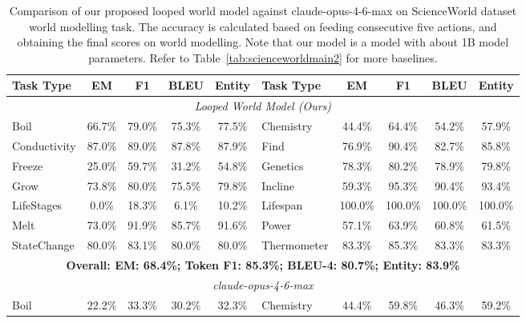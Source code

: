 \begin{table}[h]
\centering
    \setlength\tabcolsep{2.5pt}
    \setlength\extrarowheight{0pt}
\caption{Comparison of our proposed looped world model against claude-opus-4-6-max \citep{anthropic2026opus46} on ScienceWorld dataset \citep{wang-etal-2022-scienceworld} world modelling task. The accuracy is calculated based on feeding consecutive five actions, and obtaining the final scores on world modelling. Note that our model is a model with about 1B model parameters. Refer to Table~\ref{tab:scienceworldmain2} for more baselines.}
\label{tab:scienceworldmain}
\begin{tabular}{lcccc|lcccc}
\toprule
\textbf{Task Type} & \textbf{EM} & \textbf{F1}
  & \textbf{BLEU} & \textbf{Entity} & \textbf{Task Type} & \textbf{EM} & \textbf{F1}
  & \textbf{BLEU} & \textbf{Entity} \\
\midrule
\multicolumn{10}{c}{\textit{Looped World Model (Ours)}}\\
\midrule
Boil  & 66.7\%    &  79.0\%   & 75.3\%    &  77.5\% &
Chemistry        &    44.4\%    &   64.4\% &   54.2\%   &   57.9\%\\
Conductivity       &    87.0\%    &  89.0\%  &  87.8\%    &  87.9\% &
Find               &    76.9\%    &   90.4\%    &82.7\%      &85.8\%\\
Freeze              &    25.0\%    &  59.7\%  &  31.2\%      &54.8\%&
Genetics          &    78.3\%   &   80.2\%   & 78.9\%    &  79.8\%\\
Grow               &    73.8\%   &   80.0\%  &  75.5\%  &    79.8\%&
Incline           &    59.3\%   &   95.3\%  &  90.4\%  &    93.4\%\\
LifeStages          &     0.0\%    &  18.3\%   &  6.1\%      &10.2\%&
Lifespan            &   100.0\%   &  100.0\%  & 100.0\%   &  100.0\%\\
Melt               &    73.0\%    &  91.9\%  &  85.7\%   &   91.6\%&
Power               &    57.1\%   &   63.9\% &   60.8\%    &  61.5\%\\
StateChange         &    80.0\%    &  83.1\%  &  80.0\%   &   80.0\%&
Thermometer         &    83.3\%   &   85.3\%  &  83.3\%    &  83.3\%\\
\midrule
\multicolumn{10}{c}{\textbf{Overall: EM: 68.4\%; Token F1: 85.3\%; BLEU-4: 80.7\%; Entity: 83.9\%}}\\
\midrule
\multicolumn{10}{c}{\textit{claude-opus-4-6-max}}\\
\midrule
Boil                &    22.2\%  &    33.3\%  &  30.2\%    &  32.3\% &
Chemistry          &    44.4\%   &   59.8\%   & 46.3\%    &  59.2\% \\

\end{tabular}
\end{table}
